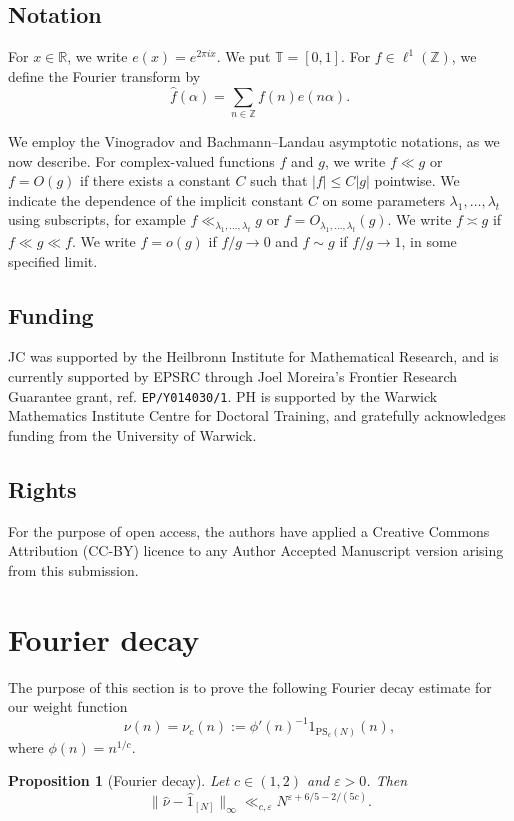 \documentclass[12pt, reqno]{amsart}
\newtheorem{prop}[thm]{Proposition}
\theoremstyle{definition}
\theoremstyle{remark}
\numberwithin{equation}{section}
\theoremstyle{definition}
\def\alp{{\alpha}} \def\bfalp{{\boldsymbol \alpha}}
\def\lam{{\lambda}} \def\Lam{{\Lambda}} \def\Lamtil{{\widetilde \Lambda}}
\def\eps{\varepsilon}
\def\le{\leqslant} \def\ge{\geqslant} \def\pleq{\preccurlyeq} \def\ple{\prec}
\def \bR {\mathbb R}
\def \bZ {\mathbb Z}
\def \bT {\mathbb T}
\def \PS {\mathrm{PS}}
\begin{document}
\subsection*{Notation}

For $x \in \bR$, we write $e(x) = e^{2 \pi i x}$. We put $\bT = [0,1]$. For $f \in \ell^1(\bZ)$, we define the Fourier transform by
\[
\hat f(\alp) = \sum_{n \in \bZ} f(n) e(n \alp).
\]

We employ the Vinogradov and Bachmann--Landau asymptotic notations, as we now describe. For complex-valued functions $f$ and $g$, we write $f \ll g$ or $f = O(g)$ if there exists a constant $C$ such that $|f| \le C|g|$ pointwise. We indicate the dependence of the implicit constant $C$ on some parameters $\lam_1, \ldots, \lam_t$ using subscripts, for example $f \ll_{\lam_1, \ldots, \lam_t} g$ or $f = O_{\lam_1, \ldots, \lam_t}(g)$. We write $f \asymp g$ if $f \ll g \ll f$. We write $f = o(g)$ if $f/g \to 0$ and $f \sim g$ if $f/g \to 1$, in some specified limit.

\subsection*{Funding}

JC was supported by the Heilbronn Institute for Mathematical Research, and is currently supported by EPSRC through Joel Moreira's Frontier Research Guarantee grant, ref. \texttt{EP/Y014030/1}. PH is supported by the Warwick Mathematics Institute Centre
for Doctoral Training, and gratefully acknowledges funding from the University of Warwick.

\subsection*{Rights}

For the purpose of open access, the authors have applied a
Creative Commons Attribution (CC-BY) licence to any Author Accepted Manuscript version arising from this submission.

\section{Fourier decay}
\label{sec2}

The purpose of this section is to prove the following Fourier decay estimate for our weight function 
\[
\nu(n) = \nu_c(n):= \phi'(n)^{-1} 1_{\PS_c(N)}(n),
\]
where $\phi(n) = n^{1/c}$.

\begin{prop} [Fourier decay]
\label{prop2.1}
Let $c \in (1,2)$ and $\eps > 0$. Then
\[
\| \hat \nu - \hat 1_{[N]} \|_\infty
\ll_{c, \eps} N^{\eps + 6/5 - 2/(5c)}.
\]
\end{prop}
\end{document}
